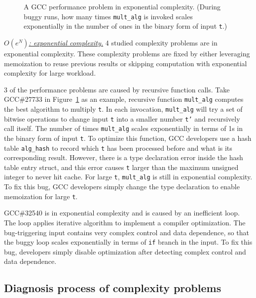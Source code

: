 \begin{figure}
\centering
{}
  \mbox{}
\caption{A GCC performance problem in exponential complexity. 
 (During buggy runs, how many times \texttt{mult\_alg} is invoked scales exponentially
  in the number of ones in the binary form of input \texttt{t}.)}
\vspace{-0.05in}
\label{fig:gcc27733}
\vspace{-0.05in}
\end{figure}


{\underline{\textit{$O(e^N)$: exponential complexity.}}}
4 studied complexity problems are in exponential complexity. 
These complexity problems are fixed by 
either leveraging memoization to reuse previous results 
or skipping computation with exponential complexity for large workload. 

3 of the performance problems are caused by recursive function calls. 
Take GCC\#27733 in Figure~\ref{fig:gcc27733} as an example, 
recursive function \texttt{mult\_alg} computes the best algorithm to multiply \texttt{t}.
In each invocation, \texttt{mult\_alg} will try a set of bitwise 
operations to change input 
\texttt{t} into a smaller number \texttt{t'} and recursively call itself. 
The number of times \texttt{mult\_alg} scales exponentially 
in terms of 1s in the binary form of input \texttt{t}. 
To optimize this function, 
GCC developers use a hash table \texttt{alg\_hash} to record
which \texttt{t} has been processed before and what is its corresponding result.
However, there is a type declaration error inside the hash table entry struct,
and this error causes \texttt{t} larger than the maximum unsigned integer to never hit cache.
For large \texttt{t}, \texttt{mult\_alg} is still in exponential complexity. 
To fix this bug, 
GCC developers simply change the type declaration to enable memoization for large \texttt{t}. 

GCC\#32540 is in exponential complexity and is caused by an inefficient loop. 
The loop applies iterative algorithm to implement a compiler optimization. 
The bug-triggering input contains very complex control and data dependence,  
so that the buggy loop scales exponentially in terms of \texttt{if} branch in the input. 
To fix this bug, developers simply disable optimization 
after detecting complex control and data dependence.  


\subsection{Diagnosis process of complexity problems}

